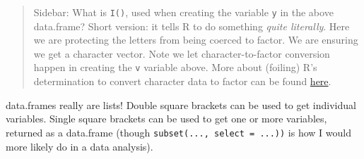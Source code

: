 \documentclass[
]{book}
\newenvironment{Shaded}{\begin{snugshade}}{\end{snugshade}}
\newcommand{\CommentTok}[1]{\textcolor[rgb]{0.56,0.35,0.01}{\textit{#1}}}
\newcommand{\DataTypeTok}[1]{\textcolor[rgb]{0.13,0.29,0.53}{#1}}
\newcommand{\DecValTok}[1]{\textcolor[rgb]{0.00,0.00,0.81}{#1}}
\newcommand{\FloatTok}[1]{\textcolor[rgb]{0.00,0.00,0.81}{#1}}
\newcommand{\KeywordTok}[1]{\textcolor[rgb]{0.13,0.29,0.53}{\textbf{#1}}}
\newcommand{\NormalTok}[1]{#1}
\newcommand{\OperatorTok}[1]{\textcolor[rgb]{0.81,0.36,0.00}{\textbf{#1}}}
\newcommand{\StringTok}[1]{\textcolor[rgb]{0.31,0.60,0.02}{#1}}
\begin{document}
\begin{Shaded}
\end{Shaded}

\begin{quote}
Sidebar: What is \texttt{I()}, used when creating the variable \texttt{y} in the above data.frame? Short version: it tells R to do something \emph{quite literally}. Here we are protecting the letters from being coerced to factor. We are ensuring we get a character vector. Note we let character-to-factor conversion happen in creating the \texttt{v} variable above. More about (foiling) R's determination to convert character data to factor can be found \protect\hyperlink{factors-boss}{here}.
\end{quote}

data.frames really are lists! Double square brackets can be used to get individual variables. Single square brackets can be used to get one or more variables, returned as a data.frame (though \texttt{subset(...,\ select\ =\ ...))} is how I would more likely do in a data analysis).
\end{document}
